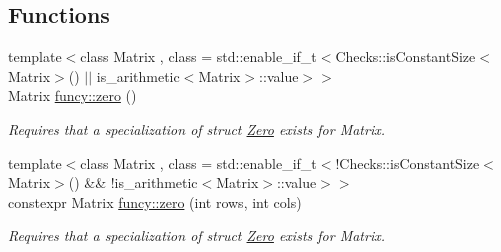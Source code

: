 \subsection*{Functions}
\begin{DoxyCompactItemize}
\item 
{\footnotesize template$<$class Matrix , class  = std\-::enable\-\_\-if\-\_\-t$<$\-Checks\-::is\-Constant\-Size$<$\-Matrix$>$() $\vert$$\vert$ is\-\_\-arithmetic$<$\-Matrix$>$\-::value$>$$>$ }\\Matrix \hyperlink{namespacefuncy_ac1f22224f100309c6d5c5b336ddb3915}{funcy\-::zero} ()
\begin{DoxyCompactList}\small\item\em Requires that a specialization of struct \hyperlink{structfuncy_1_1Zero}{Zero} exists for Matrix. \end{DoxyCompactList}\item 
{\footnotesize template$<$class Matrix , class  = std\-::enable\-\_\-if\-\_\-t$<$!\-Checks\-::is\-Constant\-Size$<$\-Matrix$>$() \&\& !is\-\_\-arithmetic$<$\-Matrix$>$\-::value$>$$>$ }\\constexpr Matrix \hyperlink{namespacefuncy_a0f3ab3167272c9911b70265396fa049b}{funcy\-::zero} (int rows, int cols)
\begin{DoxyCompactList}\small\item\em Requires that a specialization of struct \hyperlink{structfuncy_1_1Zero}{Zero} exists for Matrix. \end{DoxyCompactList}\end{DoxyCompactItemize}

